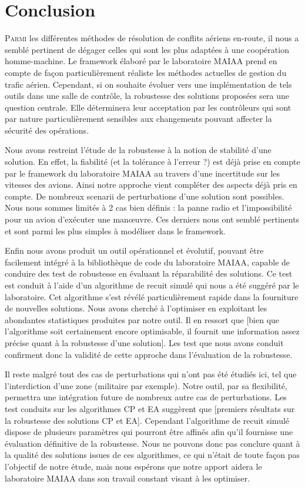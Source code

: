 \chapter*{Conclusion}

\lettrine{P}{armi} les différentes méthodes de résolution de conflits aériens en-route, il nous a semblé pertinent de dégager celles qui sont les plus adaptées à une coopération homme-machine. Le framework élaboré par le laboratoire MAIAA prend en compte de façon particulièrement réaliste les méthodes actuelles de gestion du trafic aérien. Cependant, si on souhaite évoluer vers une implémentation de tels outils dans une salle de contrôle, la robustesse des solutions proposées sera une question centrale. Elle déterminera leur acceptation par les contrôleurs qui sont par nature particulièrement sensibles aux changements pouvant affecter la sécurité des opérations.

Nous avons restreint l'étude de la robustesse à la notion de stabilité d'une solution. En effet, la fiabilité (et la tolérance à l'erreur ?) est déjà prise en compte par le framework du laboratoire MAIAA au travers d'une incertitude sur les vitesses des avions. Ainsi notre approche vient compléter des aspects déjà pris en compte. De nombreux scenarii de perturbations d'une solution sont possibles. Nous nous sommes limités à 2 cas bien définis : la panne radio et l'impossibilité pour un avion d'exécuter une manœuvre. Ces derniers nous ont semblé pertinents et sont parmi les plus simples à modéliser dans le framework.

Enfin nous avons produit un outil opérationnel et évolutif, pouvant être facilement intégré à la bibliothèque de code du laboratoire MAIAA, capable de conduire des test de robustesse en évaluant la réparabilité des solutions. Ce test est conduit à l'aide d'un algorithme de recuit simulé qui nous a été suggéré par le laboratoire. Cet algorithme s'est révélé particulièrement rapide dans la fourniture de nouvelles solutions. Nous avons cherché à l'optimiser en exploitant les abondantes statistiques produites par notre outil. Il en ressort que [bien que l'algorithme soit certainement encore optimisable, il fournit une information assez précise quant à la robustesse d'une solution]. Les test que nous avons conduit confirment donc la validité de cette approche dans l'évaluation de la robustesse.

Il reste malgré tout des cas de perturbations qui n'ont pas été étudiés ici, tel que l'interdiction d'une zone (militaire par exemple). Notre outil, par sa flexibilité, permettra une intégration future de nombreux autre cas de perturbations. Les test conduits sur les algorithmes CP et EA suggèrent que [premiers résultats sur la robustesse des solutions CP et EA]. 
Cependant l'algorithme de recuit simulé dispose de plusieurs paramètres qui pourront être affinés afin qu'il fournisse une évaluation définitive de la robustesse. Nous ne pouvons donc pas conclure quant à la qualité des solutions issues de ces algorithmes, ce qui n'était de toute façon pas l'objectif de notre étude, mais nous espérons que notre apport aidera le laboratoire MAIAA dans son travail constant visant à les optimiser.

\thispagestyle{plain}